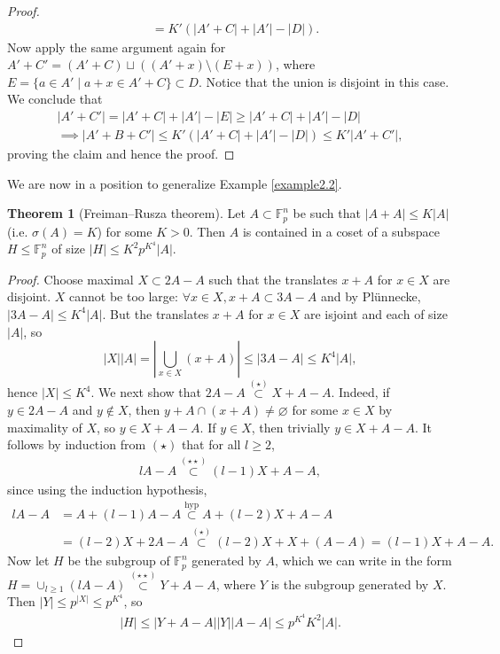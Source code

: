 \documentclass{article}
\theoremstyle{definition}
\newtheorem{theorem}{Theorem}[section]
\begin{document}
\begin{proof}
\begin{align*}
        &= K'(\left|A'+C\right|+\left|A'\right|-\left|D\right|).
    \end{align*}
    Now apply the same argument again for $A'+C' = (A' + C) \sqcup ((A'+x)\setminus (E+x))$, where $E = \{a \in A' \mid a+x \in A'+C\} \subset D$. Notice that the union is disjoint in this case. We conclude that 
    \begin{align*}
        \left|A'+C'\right| = \left|A'+C\right| + \left|A'\right| - \left|E\right| \ge \left|A'+C\right| + \left|A'\right| - \left|D\right|\\
        \implies \left|A'+B+C'\right|\le K'(\left|A'+C\right|+\left|A'\right|-\left|D\right|)\le K'\left|A'+C'\right|,
    \end{align*}
    proving the claim and hence the proof.
\end{proof}
We are now in a position to generalize Example \ref{example2.2}.
\begin{theorem}[Freiman--Rusza theorem]\label{theorem2.8}
    Let $A \subset \mathbb{F}_p^n$ be such that $\left|A+A\right|\le K\left|A\right|$ (i.e. $\sigma(A)=K$) for some $K>0$. Then $A$ is contained in a coset of a subspace $H\le \mathbb{F}_p^n$ of size $\left|H\right|\le K^2p^{K^4}\left|A\right|$.
\end{theorem}
\begin{proof}
    Choose maximal $X \subset 2A-A$ such that the translates $x+A$ for $x \in X$ are disjoint. $X$ cannot be too large: $\forall x \in X, x+A \subset 3A-A$ and by Plünnecke, $\left|3A-A\right| \le K^4\left|A\right|$. But the translates $x+A$ for $x \in X$ are isjoint and each of size $\left|A\right|$, so
    \[
    \left|X\right|\left|A\right| = \left|\bigcup_{x \in X}(x+A) \right|\le \left|3A-A\right| \le K^4\left|A\right|,
    \]
    hence $\left|X\right|\le K^4$. We next show that $2A-A \stackrel{(\star)}{\subset}  X+A-A$. Indeed, if $y \in 2A-A$ and $y \not\in X$, then $y+A \cap (x+A) \neq \varnothing$ for some $x \in X$ by maximality of $X$, so $y \in X+A-A$. If $y \in X$, then trivially $y \in X+A-A$. It follows by induction from $(\star)$ that for all $l\ge 2$,
    \begin{align*}
        lA-A \stackrel{(\star\star)}{\subset}  (l-1)X + A -A,
    \end{align*}
    since using the induction hypothesis,
    \begin{align*}
        lA-A &= A+(l-1)A - A \stackrel{\text{hyp}}{\subset} A + (l-2)X + A - A \\
        &= (l-2)X + 2A - A \stackrel{(\star)}{\subset } (l-2)X +X +(A-A) = (l-1)X+A-A.
    \end{align*}
    Now let $H$ be the subgroup of $\mathbb{F}_p^n$ generated by $A$, which we can write in the form $H = \cup_{l\ge 1}(lA-A) \stackrel{(\star\star)}{\subset} Y+A-A$, where $Y$ is the subgroup generated by $X$. Then $\left|Y\right|\le p^{\left|X\right|} \le p^{K^4}$, so
    \begin{align*}
        \left|H\right|\le \left|Y+A-A\right|\left|Y\right|\left|A-A\right|\le p^{K^4}K^2\left|A\right|.
    \end{align*}
\end{proof}
\end{document}

